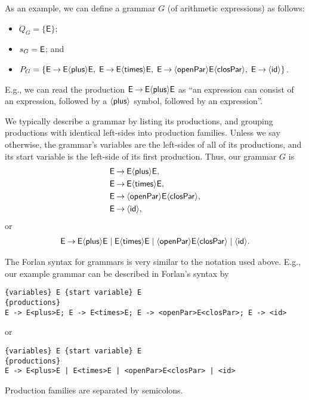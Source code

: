 As an example, we can define a grammar $G$ (of arithmetic expressions) as
follows:
\begin{itemize}
\item $Q_G=\{\mathsf{E}\}$;

\item $s_G=\mathsf{E}$; and

\item $P_G=\{\mathsf{E\mathbin{\to} E{\langle\mathsf{plus}\rangle} E,\;
E\mathbin{\to} E{\langle\mathsf{times}\rangle} E,\;
E\mathbin{\to}{\langle\mathsf{openPar}\rangle} E{\langle\mathsf{closPar}\rangle},\;
E\mathbin{\to}{\langle\mathsf{id}\rangle}}\}$.
\end{itemize}
E.g., we can read the production $\mathsf{E}\mathbin{\to}\mathsf{E}{\langle\mathsf{plus}\rangle}\mathsf{E}$
as ``an expression can consist of an expression, followed by
a ${\langle\mathsf{plus}\rangle}$ symbol, followed by an expression''.

We typically describe a grammar by listing its productions, and
grouping productions with identical left-sides into production
families.  Unless we say otherwise, the grammar's variables are the
left-sides of all of its productions, and its start variable is the
left-side of its first production.
Thus, our grammar $G$ is
\begin{align*}
\mathsf{E} &\mathbin{\to} \mathsf{E}{\langle\mathsf{plus}\rangle}\mathsf{E} , \\
\mathsf{E} &\mathbin{\to} \mathsf{E}{\langle\mathsf{times}\rangle}\mathsf{E} , \\
\mathsf{E} &\mathbin{\to} {\langle\mathsf{openPar}\rangle}\mathsf{E}{\langle\mathsf{closPar}\rangle} , \\
\mathsf{E} &\mathbin{\to} {\langle\mathsf{id}\rangle} ,
\end{align*}
or
\begin{gather*}
\mathsf{E\mathbin{\to} E{\langle\mathsf{plus}\rangle} E\mid E{\langle\mathsf{times}\rangle} E\mid {\langle\mathsf{openPar}\rangle} E{\langle\mathsf{closPar}\rangle} \mid
{\langle\mathsf{id}\rangle}} .
\end{gather*}

%
The Forlan syntax for grammars is very similar to the notation used
above.  E.g., our example grammar can be described in Forlan's syntax
by
\begin{verbatim}
{variables} E {start variable} E
{productions}
E -> E<plus>E; E -> E<times>E; E -> <openPar>E<closPar>; E -> <id>
\end{verbatim}
or
\begin{verbatim}
{variables} E {start variable} E
{productions}
E -> E<plus>E | E<times>E | <openPar>E<closPar> | <id>
\end{verbatim}
Production families are separated by semicolons.

